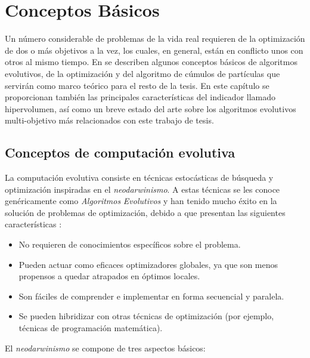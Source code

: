 \chapter{Conceptos B\'asicos}
  Un n\'umero considerable de problemas de la vida real requieren de la optimizaci\'on de dos o m\'as objetivos a la vez, 
  los cuales, en general, est\'an en conflicto unos con otros al mismo tiempo. En \DIFdelbegin {}\DIFdelend \DIFaddbegin {}\DIFaddend se describen algunos 
  conceptos b\'asicos de algoritmos evolutivos, de la optimizaci\'on \DIFdelbegin {}\DIFdelend \DIFaddbegin {}\DIFaddend y del algoritmo de c\'umulos de 
  part\'iculas que servir\'an como marco te\'orico para el resto de la tesis. En este cap\'itulo se proporcionan tambi\'en 
  las principales caracter\'isticas del indicador llamado hipervolumen, as\'i como un breve estado 
  del arte sobre los algoritmos evolutivos multi-objetivo m\'as relacionados con este trabajo de tesis.

  \section{Conceptos de computaci\'on evolutiva}

  La computaci\'on evolutiva consiste en t\'ecnicas estoc\'asticas de b\'usqueda y optimizaci\'on inspiradas en el 
  \textit{neodarwinismo}. A estas t\'ecnicas se les conoce gen\'ericamente como \textit{Algoritmos} \textit{Evolutivos} 
  y han tenido mucho  \'exito en la soluci\'on de problemas de optimizaci\'on, debido a que presentan las siguientes 
  caracter\'isticas \cite{vicente06}:

  \begin{itemize}
  \item No requieren de conocimientos espec\'ificos sobre el problema.
  \item Pueden actuar como eficaces optimizadores globales, ya que son menos propensos a quedar atrapados en 
  \'optimos locales.
  \item Son f\'aciles de comprender e implementar en forma secuencial y paralela.
  \item Se pueden hibridizar con otras t\'ecnicas de optimizaci\'on (por ejemplo, t\'ecnicas de programaci\'on 
  matem\'atica).
  \end{itemize}

  El \textit{neodarwinismo} se compone de tres aspectos b\'asicos:

